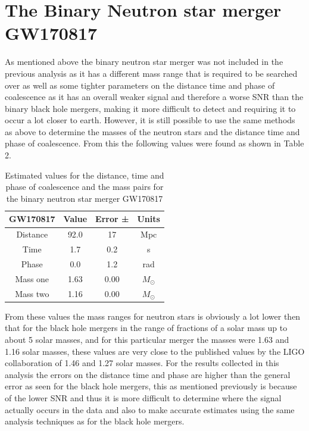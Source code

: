 \documentclass[]{article}
\begin{document}
\section*{The Binary Neutron star \newline merger GW170817}
As mentioned above the binary neutron star \newline merger was not included in the previous analysis as it has a different mass range that is required to be
searched over as well as some tighter parameters on the distance time and phase of coalescence as it has an overall weaker signal and therefore
a worse SNR than the binary black hole mergers, making it more difficult to detect and requiring it to occur a lot closer to earth.
However, it is still possible to use the same methods as above to determine the masses of the neutron stars and the distance time and phase of coalescence.
From this the following values were found as shown in Table 2.
\begin{table}[h]
    \begin{center}
        \caption{Estimated values for the distance, time and phase of coalescence and the mass pairs for the binary neutron star merger GW170817}
        \label{tab:estimates}
        \begin{tabular}{|c c c c|}
            \hline
            GW170817 & Value & Error ±& Units\\
            \hline
            Distance & 92.0 & 17 & Mpc\\
            Time & 1.7 & 0.2 & s\\
            Phase & 0.0 & 1.2 & rad\\
            Mass one & 1.63 & 0.00 & $M_{\odot}$\\
            Mass two & 1.16 & 0.00 & $M_{\odot}$\\
            \hline
        \end{tabular}

    \end{center}
\end{table}

From these values the mass ranges for neutron stars is obviously a lot lower then that for the
black hole mergers in the range of fractions of a solar mass up to about 5 solar masses,
and for this particular merger the masses were 1.63 and 1.16 solar masses, these values are very close to the
published values by the LIGO collaboration of 1.46 and 1.27 solar masses. For the results collected
in this analysis the errors on the distance time and phase are higher than the general error as seen for the
black hole mergers, this as mentioned previously is because of the lower SNR and thus
it is more difficult to determine where the signal actually occurs in the data
and also to make accurate estimates using the same analysis techniques as
for the black hole mergers.
\end{document}

